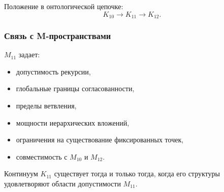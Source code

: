 Положение в онтологической цепочке:
\[
K_{10} \to K_{11} \to K_{12}.
\]

\subsubsection{Связь с M-пространствами}

$M_{11}$ задает:
\begin{itemize}
    \item допустимость рекурсии,
    \item глобальные границы согласованности,
    \item пределы ветвления,
    \item мощности иерархических вложений,
    \item ограничения на существование фиксированных точек,
    \item совместимость с $M_{10}$ и $M_{12}$.
\end{itemize}

Континуум $K_{11}$ существует тогда и только тогда, когда его структуры удовлетворяют области допустимости $M_{11}$.
